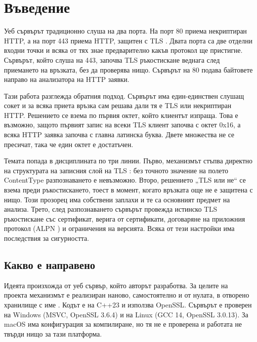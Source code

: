 \section{Въведение}
\label{sec:intro}

Уеб сървърът традиционно слуша на два порта. На порт 80 приема некриптиран HTTP, а на
порт 443 приема HTTP, защитен с TLS \cite{rfc9110}. Двата порта са две отделни входни
точки и всяка от тях знае предварително какъв протокол ще пристигне. Сървърът, който
слуша на 443, започва TLS ръкостискане веднага след приемането на връзката, без да
проверява нищо. Сървърът на 80 подава байтовете направо на анализатора на HTTP заявки.

Тази работа разглежда обратния подход. Сървърът има един-единствен слушащ сокет и за
всяка приета връзка сам решава дали тя е TLS или некриптиран HTTP. Решението се взема по
първия октет, който клиентът изпраща. Това е възможно, защото първият запис на всеки TLS
клиент започва с октет 0x16, а всяка HTTP заявка започва с главна латинска буква. Двете
множества не се пресичат, така че един октет е достатъчен.

Темата попада в дисциплината по три линии. Първо, механизмът стъпва директно на
структурата на записния слой на TLS \cite{rfc8446}: без точното значение на полето
ContentType разпознаването е невъзможно. Второ, решението „TLS или не“ се взема преди
ръкостискането, тоест в момент, когато връзката още не е защитена с нищо. Този прозорец
има собствени заплахи и те са основният предмет на анализа. Трето, след разпознаването
сървърът провежда истинско TLS ръкостискане със сертификат, верига от сертификати,
договаряне на приложния протокол (ALPN \cite{rfc7301}) и ограничения на версията.
Всяка от тези настройки има последствия за сигурността.

\subsection{Какво е направено}

Идеята произхожда от уеб сървър, който авторът разработва. За целите на проекта
механизмът е реализиран наново, самостоятелно и от нулата, в отворено хранилище с име
 \cite{octet}. Кодът е на C++23 и използва OpenSSL. Сървърът е проверен на
Windows (MSVC, OpenSSL 3.6.4) и на Linux (GCC 14, OpenSSL 3.0.13). За macOS има
конфигурация за компилиране, но тя не е проверена и работата не твърди нищо за тази
платформа.

